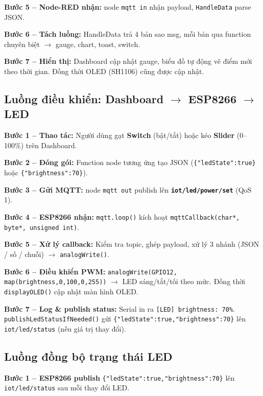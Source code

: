 \documentclass[13pt,a4paper]{article}
\newcommand{\code}[1]{\texttt{#1}}
\begin{document}
\textbf{Bước 5 -- Node-RED nhận:} node \code{mqtt in} nhận payload, \code{HandleData} parse JSON.

\textbf{Bước 6 -- Tách luồng:} HandleData trả 4 bản sao msg, mỗi bản qua function chuyên biệt $\rightarrow$ gauge, chart, toast, switch.

\textbf{Bước 7 -- Hiển thị:} Dashboard cập nhật gauge, biểu đồ tự động vẽ điểm mới theo thời gian. Đồng thời OLED (SH1106) cũng được cập nhật.

\subsection{Luồng điều khiển: Dashboard $\rightarrow$ ESP8266 $\rightarrow$ LED}
\label{sec:luong2}

\textbf{Bước 1 -- Thao tác:} Người dùng gạt \textbf{Switch} (bật/tắt) hoặc kéo \textbf{Slider} (0--100\%) trên Dashboard.

\textbf{Bước 2 -- Đóng gói:} Function node tương ứng tạo JSON (\code{\{"ledState":true\}} hoặc \code{\{"brightness":70\}}).

\textbf{Bước 3 -- Gửi MQTT:} node \code{mqtt out} publish lên \textbf{\code{iot/led/power/set}} (QoS 1).

\textbf{Bước 4 -- ESP8266 nhận:} \code{mqtt.loop()} kích hoạt \code{mqttCallback(char*, byte*, unsigned int)}.

\textbf{Bước 5 -- Xử lý callback:} Kiểm tra topic, ghép payload, xử lý 3 nhánh (JSON / số / chuỗi) $\rightarrow$ \code{analogWrite()}.

\textbf{Bước 6 -- Điều khiển PWM:} \code{analogWrite(GPIO12, map(brightness,0,100,0,255))} $\rightarrow$ LED sáng/tắt/tối theo mức. Đồng thời \code{displayOLED()} cập nhật màn hình OLED.

\textbf{Bước 7 -- Log \& publish status:} Serial in ra \code{[LED] brightness: 70\%}. \code{publishLedStatusIfNeeded()} gửi \code{\{"ledState":true,"brightness":70\}} lên \code{iot/led/status} (nếu giá trị thay đổi).

\subsection{Luồng đồng bộ trạng thái LED}
\label{sec:luong3}

\textbf{Bước 1 -- ESP8266 publish} \code{\{"ledState":true,"brightness":70\}} lên \code{iot/led/status} sau mỗi thay đổi LED.
\end{document}
